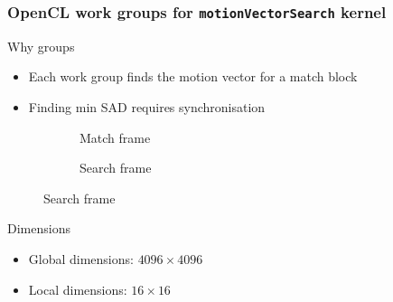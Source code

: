 \begin{frame}
  \frametitle{OpenCL work groups for \lstinline{motionVectorSearch}
    kernel}
  \begin{block}{Why groups}
    \begin{itemize}
    \item<+-> Each work group finds the \alert{motion vector} for a
      \alert{match block}
    \item<+-> Finding min \alert{SAD} requires synchronisation
    \end{itemize}
  \end{block}
  \begin{figure}
    \centering
    \begin{subfigure}{.5\textwidth}
      \centering
      \caption{Match frame}
    \end{subfigure}%
    \begin{subfigure}{.5\textwidth}
      \centering
      \caption{Search frame}
    \end{subfigure}
  \end{figure}
  \onslide<+->
  \begin{alertblock}{Dimensions}
    \begin{itemize}
    \item<+-> Global dimensions: \(4096 \times 4096\)
    \item<+-> Local dimensions: \(16 \times 16\)
    \end{itemize}
  \end{alertblock}
\end{frame}

